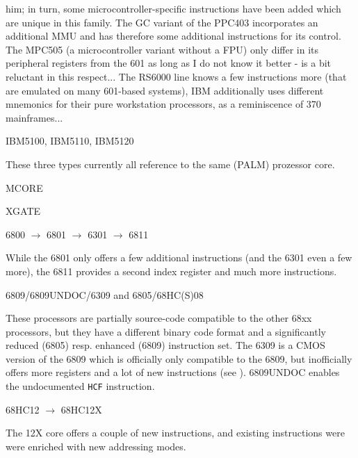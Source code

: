 \documentclass[12pt,twoside]{report}
\begin{document}
him; in turn, some microcontroller-specific instructions have been added
which are unique in this family.  The GC variant of the PPC403
incorporates an additional MMU and has therefore some additional
instructions for its control.  The MPC505 (a microcontroller variant
without a FPU) only differ in its peripheral registers from the 601 as
long as I do not know it better - \cite{Mot505} is a bit reluctant in this
respect...  The RS6000 line knows a few instructions more (that are
emulated on many 601-based systems), IBM additionally uses different
mnemonics for their pure workstation processors, as a reminiscence of 370
mainframes...
\begin{cpulist}
   IBM5100, IBM5110, IBM5120
\end{cpulist}
These three types currently all reference to the same (PALM)
prozessor core.
\begin{cpulist}
   MCORE
\end{cpulist}
\begin{cpulist}
   XGATE
\end{cpulist}
\begin{cpulist}
   6800 $\rightarrow$ 6801 $\rightarrow$ 6301 $\rightarrow$ 6811
\end{cpulist}
While the 6801 only offers a few additional instructions (and the
6301 even a few more), the 6811 provides a second index register and
much more instructions.
\begin{cpulist}
   6809/6809UNDOC/6309 and 6805/68HC(S)08
\end{cpulist}
These processors are partially source-code compatible to the other
68xx processors, but they have a different binary code format and a
significantly reduced (6805) resp. enhanced (6809) instruction set.
The 6309 is a CMOS version of the 6809 which is officially only
compatible to the 6809, but inofficially offers more registers and a
lot of new instructions (see \cite{Kaku}).  6809UNDOC enables the
undocumented {\tt HCF} instruction.
\begin{cpulist}
   68HC12 $\longrightarrow$ 68HC12X
\end{cpulist}
The 12X core offers a couple of new instructions, and existing
instructions were were enriched with new addressing modes.
\end{document}
